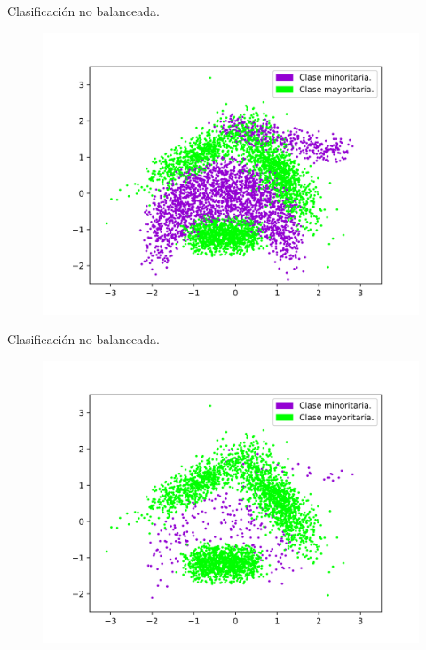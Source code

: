 \documentclass[10pt]{beamer}
\begin{document}
\begin{frame}[fragile]{Clasificación no balanceada.}
	\begin{figure}[H]
	\centering
	\includegraphics[width=\linewidth]{./imagenes/original}
	\end{figure}
\end{frame}

\begin{frame}[fragile]{Clasificación no balanceada.}
	\begin{figure}[H]
	\centering
	\includegraphics[width=\linewidth]{./imagenes/imbalanced}
	\end{figure}
\end{frame}
\end{document}
